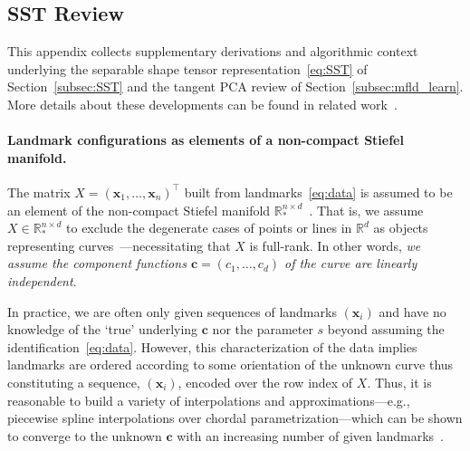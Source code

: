 \documentclass[pdflatex,iicol]{sn-jnl}%
\theoremstyle{thmstyleone}%
\theoremstyle{thmstyletwo}%
\theoremstyle{thmstylethree}%
\begin{document}
\begin{appendices}

\section{SST Review}\label{secA0}
This appendix collects supplementary derivations and algorithmic context underlying the separable shape tensor representation~\eqref{eq:SST} of Section~\ref{subsec:SST} and the tangent PCA review of Section~\ref{subsec:mfld_learn}. More details about these developments can be found in related work~\cite{grey2023separable}.

\paragraph{Landmark configurations as elements of a non-compact Stiefel manifold.}
The matrix $X = (\boldsymbol{x}_1,\dots,\boldsymbol{x}_n)^{\top}$ built from landmarks~\eqref{eq:data} is assumed to be an element of the non-compact Stiefel manifold $\mathbb{R}^{n \times d}_*$~\cite{absil2008optimization}. That is, we assume $X \in \mathbb{R}^{n \times d}_*$ to exclude the degenerate cases of points or lines in $\mathbb{R}^d$ as objects representing curves~\cite{grey2023separable}---necessitating that $X$ is full-rank. In other words, \textit{we assume the component functions $\boldsymbol{c} = (c_1,\dots,c_d)$ of the curve are linearly independent}.

In practice, we are often only given sequences of landmarks $(\boldsymbol{x}_i)$ and have no knowledge of the `true' underlying $\boldsymbol{c}$ nor the parameter $s$ beyond assuming the identification~\eqref{eq:data}. However, this characterization of the data implies landmarks are ordered according to some orientation of the unknown curve thus constituting a sequence, $(\boldsymbol{x}_i)$, encoded over the row index of $X$. Thus, it is reasonable to build a variety of interpolations and approximations---e.g., piecewise spline interpolations over chordal parametrization---which can be shown to converge to the unknown $\boldsymbol{c}$ with an increasing number of given landmarks~\cite{grey2023separable, floater2005arc}.


\end{appendices}
\end{document}
